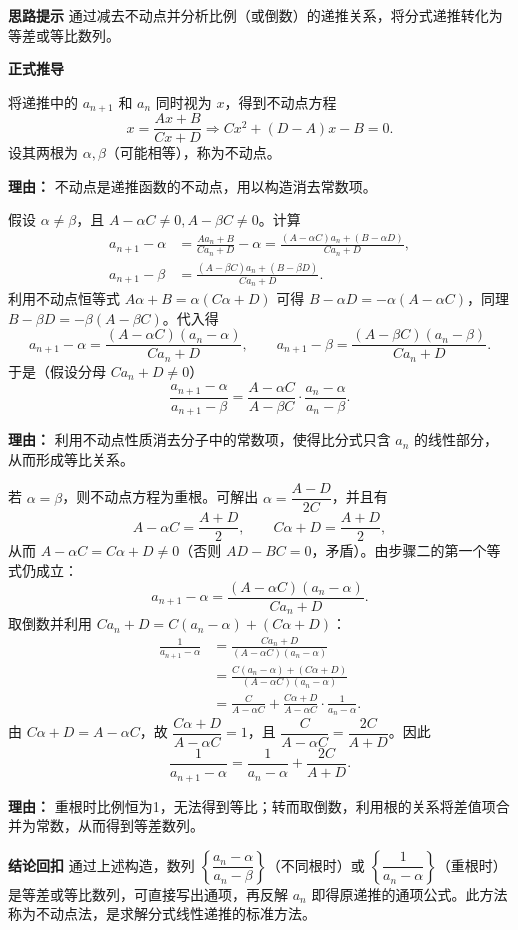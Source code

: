 \begin{proofbox}
	\textbf{\textcolor{CProof}{思路提示}}
	通过减去不动点并分析比例（或倒数）的递推关系，将分式递推转化为等差或等比数列。

	\medskip
	\textbf{\textcolor{CProof}{正式推导}}
	\begin{description}[style=nextline, leftmargin=2.8em, labelsep=0.5em, itemsep=0.55em]
		\item[\textbf{步骤一（不动点求解）：}]
			将递推中的 $a_{n+1}$ 和 $a_n$ 同时视为 $x$，得到不动点方程
			\[
				x = \frac{Ax+B}{Cx+D}\Longrightarrow Cx^2+(D-A)x-B=0.
			\]
			设其两根为 $\alpha,\beta$（可能相等），称为不动点。
			\par\textbf{理由：} 不动点是递推函数的不动点，用以构造消去常数项。
		\item[\textbf{步骤二（不同根做比）：}]
			假设 $\alpha\neq\beta$，且 $A-\alpha C\neq0,A-\beta C\neq0$。计算
			\[
				\begin{aligned}
					a_{n+1}-\alpha &= \frac{Aa_n+B}{Ca_n+D}-\alpha = \frac{(A-\alpha C)a_n+(B-\alpha D)}{Ca_n+D},\\ a_{n+1}-\beta &= \frac{(A-\beta C)a_n+(B-\beta D)}{Ca_n+D}.
			\end{aligned}
			\]
			利用不动点恒等式 $A\alpha+B=\alpha(C\alpha+D)$ 可得 $B-\alpha D = -\alpha(A-\alpha C)$，同理 $B-\beta D = -\beta(A-\beta C)$。代入得
			\[
				a_{n+1}-\alpha = \frac{(A-\alpha C)(a_n-\alpha)}{Ca_n+D},
				\qquad
				a_{n+1}-\beta = \frac{(A-\beta C)(a_n-\beta)}{Ca_n+D}.
			\]
			于是（假设分母 $Ca_n+D\neq0$）
			\[
				\frac{a_{n+1}-\alpha}{a_{n+1}-\beta} = \frac{A-\alpha C}{A-\beta C}\cdot\frac{a_n-\alpha}{a_n-\beta}.
			\]
			\par\textbf{理由：} 利用不动点性质消去分子中的常数项，使得比分式只含 $a_n$ 的线性部分，从而形成等比关系。
		\item[\textbf{步骤三（重根取倒数）：}]
			若 $\alpha=\beta$，则不动点方程为重根。可解出 $\alpha = \dfrac{A-D}{2C}$，并且有
			\[
				A-\alpha C = \frac{A+D}{2},
				\qquad
				C\alpha+D = \frac{A+D}{2},
			\]
			从而 $A-\alpha C = C\alpha+D \neq 0$（否则 $AD-BC=0$，矛盾）。由步骤二的第一个等式仍成立：
			\[
				a_{n+1}-\alpha = \frac{(A-\alpha C)(a_n-\alpha)}{Ca_n+D}.
			\]
			取倒数并利用 $Ca_n+D = C(a_n-\alpha) + (C\alpha+D)$：
			\[
				\begin{aligned}
					\frac{1}{a_{n+1}-\alpha} &= \frac{Ca_n+D}{(A-\alpha C)(a_n-\alpha)} \\ &= \frac{C(a_n-\alpha)+(C\alpha+D)}{(A-\alpha C)(a_n-\alpha)} \\ &= \frac{C}{A-\alpha C} + \frac{C\alpha+D}{A-\alpha C}\cdot\frac{1}{a_n-\alpha}.
			\end{aligned}
			\]
			由 $C\alpha+D = A-\alpha C$，故 $\dfrac{C\alpha+D}{A-\alpha C}=1$，且 $\dfrac{C}{A-\alpha C} = \dfrac{2C}{A+D}$。因此
			\[
				\frac{1}{a_{n+1}-\alpha} = \frac{1}{a_n-\alpha} + \frac{2C}{A+D}.
			\]
			\par\textbf{理由：} 重根时比例恒为1，无法得到等比；转而取倒数，利用根的关系将差值项合并为常数，从而得到等差数列。
	\end{description}

	\medskip
	\textbf{\textcolor{CProof}{结论回扣}}
	通过上述构造，数列 $\left\{\dfrac{a_n-\alpha}{a_n-\beta}\right\}$（不同根时）或 $\left\{\dfrac{1}{a_n-\alpha}\right\}$（重根时）是等差或等比数列，可直接写出通项，再反解 $a_n$ 即得原递推的通项公式。此方法称为不动点法，是求解分式线性递推的标准方法。
\end{proofbox}
